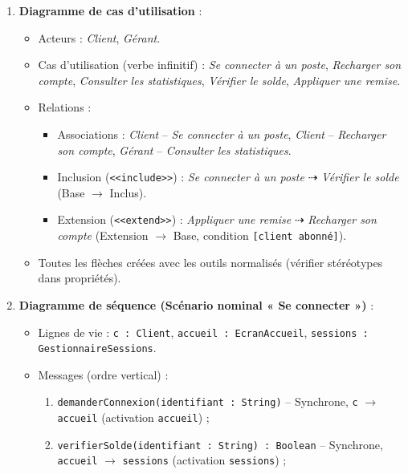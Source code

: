 \documentclass[11pt]{article}
\begin{document}
\begin{corrige}
\begin{enumerate}
\item \textbf{Diagramme de cas d'utilisation} :
      \begin{itemize}
      \item Acteurs : \emph{Client}, \emph{Gérant}.
      \item Cas d'utilisation (verbe infinitif) : \emph{Se connecter à un poste}, \emph{Recharger son compte}, \emph{Consulter les statistiques}, \emph{Vérifier le solde}, \emph{Appliquer une remise}.
      \item Relations : 
            \begin{itemize}
            \item Associations : \emph{Client} -- \emph{Se connecter à un poste}, \emph{Client} -- \emph{Recharger son compte}, \emph{Gérant} -- \emph{Consulter les statistiques}.
            \item Inclusion (\texttt{<<include>>}) : \emph{Se connecter à un poste} $\dashrightarrow$ \emph{Vérifier le solde} (Base $\rightarrow$ Inclus).
            \item Extension (\texttt{<<extend>>}) : \emph{Appliquer une remise} $\dashrightarrow$ \emph{Recharger son compte} (Extension $\rightarrow$ Base, condition \texttt{[client abonné]}).
            \end{itemize}
      \item Toutes les flèches créées avec les outils normalisés (vérifier stéréotypes dans propriétés).
      \end{itemize}
\item \textbf{Diagramme de séquence (Scénario nominal « Se connecter »)} :
      \begin{itemize}
      \item Lignes de vie : \texttt{c : Client}, \texttt{accueil : EcranAccueil}, \texttt{sessions : GestionnaireSessions}.
      \item Messages (ordre vertical) :
            \begin{enumerate}
            \item \texttt{demanderConnexion(identifiant : String)} -- Synchrone, \texttt{c} $\rightarrow$ \texttt{accueil} (activation \texttt{accueil}) ;
            \item \texttt{verifierSolde(identifiant : String) : Boolean} -- Synchrone, \texttt{accueil} $\rightarrow$ \texttt{sessions} (activation \texttt{sessions}) ;

\end{enumerate}
\end{itemize}
\end{enumerate}
\end{corrige}
\end{document}
